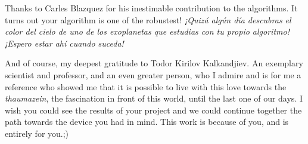 \documentclass[11pt, a4paper, twoside]{article} %
\begin{document}
Thanks to Carles Blazquez for his inestimable contribution to the algorithms. It turns out your algorithm is one of the robustest! {\em ¡Quizá algún día descubras el color del cielo de uno de los exoplanetas que estudias con tu propio algoritmo! ¡Espero estar ahí cuando suceda!}

And of course, my deepest gratitude to Todor Kirilov Kalkandjiev. An exemplary scientist and professor, and an even greater person, who I admire and is for me a reference who showed me that it is possible to live with this love towards the {\em thaumazein}, the fascination in front of this world, until the last one of our days. I wish you could see the results of your project and we could continue together the path towards the device you had in mind. This work is because of you, and is entirely for you.\vspace{0.1cm};)



\newpage

\fancyhead[OR]{ }

\fancyhead[EL]{\em }

\newpage
\fancyhead[OL]{}
\fancyhead[OR]{}
\fancyhead[EL]{}
\fancyhead[ER]{}
%
\end{document}
